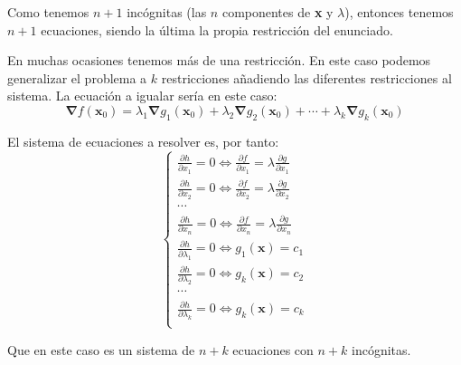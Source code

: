 \documentclass[a4paper]{article}
\begin{document}
Como tenemos $n+1$ incógnitas (las $n$ componentes de \textbf{x} y $\lambda$), entonces tenemos $n+1$ ecuaciones, siendo la última la propia restricción del enunciado.

En muchas ocasiones tenemos más de una restricción. En este caso podemos generalizar el problema a $k$ restricciones añadiendo las diferentes restricciones al sistema. La ecuación a igualar sería en este caso:
$$\boldsymbol{\nabla}f(\textbf{x}_0) = \lambda_1\boldsymbol{\nabla}g_1(\textbf{x}_0)+\lambda_2\boldsymbol{\nabla}g_2(\textbf{x}_0)+\cdots+\lambda_k\boldsymbol{\nabla}g_k(\textbf{x}_0)$$

El sistema de ecuaciones a resolver es, por tanto:
\[\begin{cases} 
\frac{\partial h}{\partial x_1} = 0 \iff \frac{\partial f}{\partial x_1} = \lambda \frac{\partial g}{\partial x_1}  \\ 
\frac{\partial h}{\partial x_2} = 0 \iff \frac{\partial f}{\partial x_2} = \lambda \frac{\partial g}{\partial x_2}  \\ 
\cdots\\
\frac{\partial h}{\partial x_n} = 0 \iff \frac{\partial f}{\partial x_n} = \lambda \frac{\partial g}{\partial x_n}  \\ 
\frac{\partial h}{\partial \lambda_1} = 0 \iff g_1(\textbf{x}) = c_1  \\ 
\frac{\partial h}{\partial \lambda_2} = 0 \iff g_k(\textbf{x}) = c_2  \\ 
\cdots\\
\frac{\partial h}{\partial \lambda_k} = 0 \iff g_k(\textbf{x}) = c_k \\ 
\end{cases}\]

Que en este caso es un sistema de $n+k$ ecuaciones con $n+k$ incógnitas.
\end{document}
